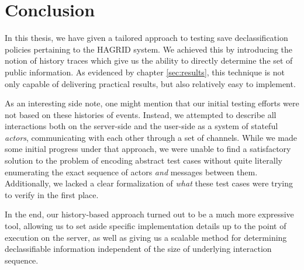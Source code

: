 \section{Conclusion}

In this thesis, we have given a tailored approach to testing save declassification policies pertaining to the HAGRID system. We achieved this by introducing the notion of history traces which give us the ability to directly determine the set of public information. As evidenced by chapter \ref{sec:results}, this technique is not only capable of delivering practical results, but also relatively easy to implement.

As an interesting side note, one might mention that our initial testing efforts were not based on these histories of events. Instead, we attempted to describe all interactions both on the server-side and the user-side as a system of stateful \emph{actors}, communicating with each other through a set of channels. 
While we made some initial progress under that approach, we were unable to find a satisfactory solution to the problem of encoding abstract test cases without quite literally enumerating the exact sequence of actors \emph{and} messages between them. Additionally, we lacked a clear formalization of \emph{what} these test cases were trying to verify in the first place.

In the end, our history-based approach turned out to be a much more expressive tool, allowing us to set aside specific implementation details up to the point of execution on the server, as well as giving us a scalable method for determining declassifiable information independent of the size of underlying interaction sequence.